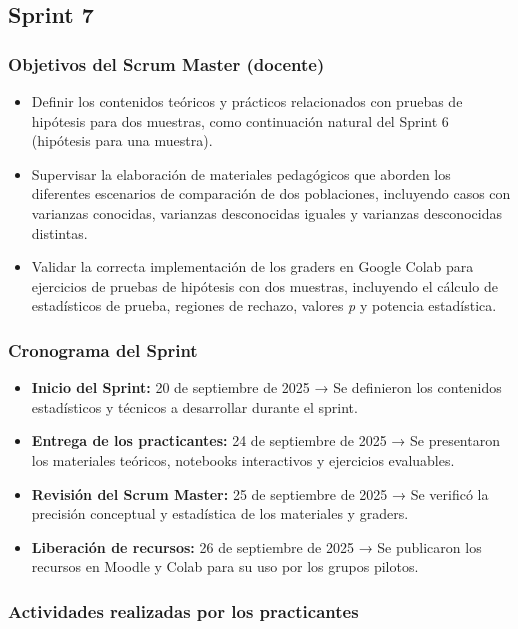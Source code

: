 \documentclass[letter,oneside,12pt,spanish]{report}
\begin{document}
\subsection{Sprint 7}

\subsubsection*{Objetivos del Scrum Master (docente)}
\begin{itemize}
	\item Definir los contenidos teóricos y prácticos relacionados con pruebas de hipótesis para dos muestras, como continuación natural del Sprint 6 (hipótesis para una muestra).
	\item Supervisar la elaboración de materiales pedagógicos que aborden los diferentes escenarios de comparación de dos poblaciones, incluyendo casos con varianzas conocidas, varianzas desconocidas iguales y varianzas desconocidas distintas.
	\item Validar la correcta implementación de los graders en Google Colab para ejercicios de pruebas de hipótesis con dos muestras, incluyendo el cálculo de estadísticos de prueba, regiones de rechazo, valores \textit{p} y potencia estadística.
\end{itemize}

\subsubsection*{Cronograma del Sprint}
\begin{itemize}
	\item \textbf{Inicio del Sprint:} 20 de septiembre de 2025 → Se definieron los contenidos estadísticos y técnicos a desarrollar durante el sprint.
	\item \textbf{Entrega de los practicantes:} 24 de septiembre de 2025 → Se presentaron los materiales teóricos, notebooks interactivos y ejercicios evaluables.
	\item \textbf{Revisión del Scrum Master:} 25 de septiembre de 2025 → Se verificó la precisión conceptual y estadística de los materiales y graders.
	\item \textbf{Liberación de recursos:} 26 de septiembre de 2025 → Se publicaron los recursos en Moodle y Colab para su uso por los grupos pilotos.
\end{itemize}

\subsubsection*{Actividades realizadas por los practicantes}
\end{document}
